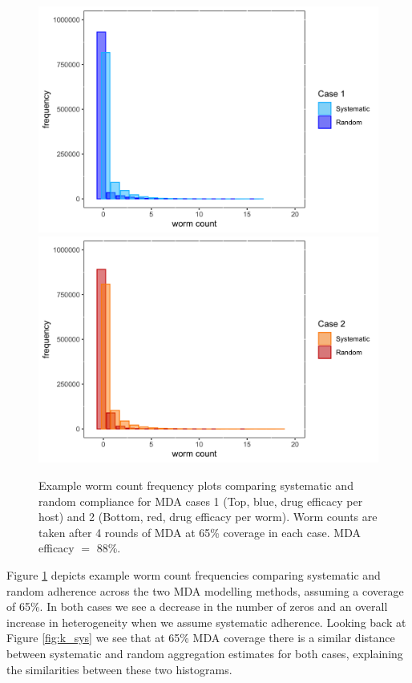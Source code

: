 \begin{figure}[h]
\begin{center}
\includegraphics[width=12.5cm]{Project/Figures/Aggregation/Case1Hist.png}\\
\includegraphics[width=12.5cm]{Project/Figures/Aggregation/Case2Hist.png}
\caption{Example worm count frequency plots comparing systematic and random compliance for MDA cases 1 (Top, blue, drug efficacy per host) and 2 (Bottom, red, drug efficacy per worm). Worm counts are taken after 4 rounds of MDA at 65\% coverage in each case. MDA efficacy $=$ 88\%.}
\label{fig:kHist}
\end{center}
\end{figure}

Figure \ref{fig:kHist} depicts example worm count frequencies comparing systematic and random adherence across the two MDA modelling methods, assuming a coverage of 65\%. In both cases we see a decrease in the number of zeros and an overall increase in heterogeneity when we assume systematic adherence. Looking back at Figure \ref{fig:k_sys} we see that at 65\% MDA coverage there is a similar distance between systematic and random aggregation estimates for both cases, explaining the similarities between these two histograms.


